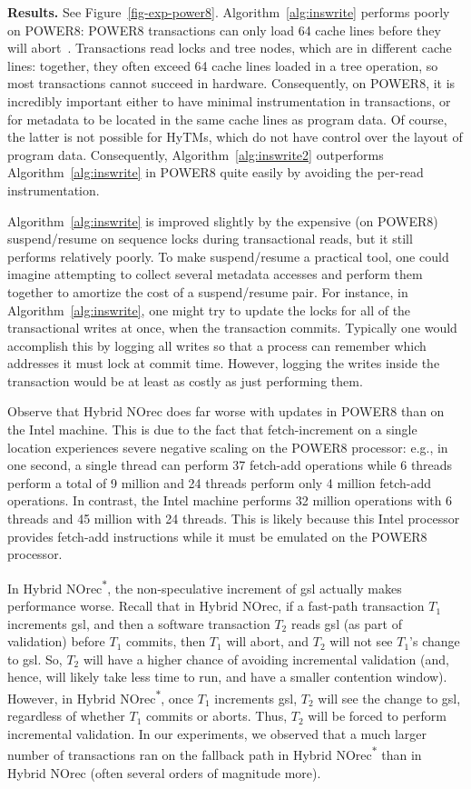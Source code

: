 \vspace{1mm}\noindent\textbf{Results.}
See Figure~\ref{fig-exp-power8}.
%
Algorithm~\ref{alg:inswrite} performs poorly on POWER8: POWER8 transactions can only load 64 cache lines before they will abort~\cite{nguyen-thesis}. 
Transactions read locks and tree nodes, which are in different cache lines: together, they often exceed 64 cache lines loaded in a tree operation, 
so most transactions cannot succeed in hardware. Consequently, on POWER8, 
it is incredibly important either to have minimal instrumentation in transactions, or for metadata to be located in the 
same cache lines as program data. Of course, the latter is not possible for HyTMs, which do not have control over the layout of program data.
Consequently, Algorithm~\ref{alg:inswrite2} outperforms Algorithm~\ref{alg:inswrite} in POWER8 quite easily by avoiding the per-read instrumentation. 

Algorithm~\ref{alg:inswrite} is improved slightly by the expensive (on POWER8) suspend/resume on sequence locks during transactional reads, but it still performs relatively poorly. 
To make suspend/resume a practical tool, one could imagine attempting to 
collect several metadata accesses and perform them together to amortize the cost of a suspend/resume pair. For instance, 
in Algorithm~\ref{alg:inswrite}, one might try to update the locks for all of the transactional writes at once, when the transaction commits. 
Typically one would accomplish this by logging all writes so that a process can remember which addresses it must lock at commit time. 
However, logging the writes inside the transaction would be at least as costly as just performing them.

Observe that Hybrid NOrec does far worse with updates in POWER8 than on the Intel machine.
This is due to the fact that fetch-increment on a single location experiences severe negative scaling on the POWER8 processor: e.g., in one second, a single
thread can perform 37 fetch-add operations while 6 threads perform a total of 9 million and 24 threads perform only 4 million fetch-add operations.
In contrast, the Intel machine performs 32 million operations with 6 threads and 45 million with 24 threads. This is likely because this Intel processor provides 
fetch-add instructions while it must be emulated on the POWER8 processor.

In Hybrid NOrec\textsuperscript{$\ast$}, the non-speculative increment of gsl actually makes performance worse. Recall that in Hybrid NOrec, 
if a fast-path transaction $T_1$ increments gsl, and then a software transaction $T_2$ reads gsl (as part of validation) before $T_1$ commits, then $T_1$ will abort, 
and $T_2$ will not see $T_1$'s change to gsl. 
So, $T_2$ will have a higher chance of avoiding incremental validation (and, hence, will likely take less time to run, and have a smaller contention window).
However, in Hybrid NOrec\textsuperscript{$\ast$}, once $T_1$ increments gsl, $T_2$ will see the change to gsl, regardless of whether $T_1$ commits or aborts. Thus, 
$T_2$ will be forced to perform incremental validation. In our experiments, we observed that a much larger number of transactions ran on 
the fallback path in Hybrid NOrec\textsuperscript{$\ast$} than in Hybrid NOrec (often several orders of magnitude more).


